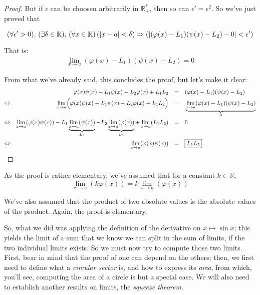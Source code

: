 \documentclass[solutions.tex]{subfiles}
\begin{document}
\begin{proof}
But if $\epsilon$ can be choosen arbitrarily in $\mathbb{R}^*_+$, then
so can $\epsilon'=\epsilon^2$. So we've just proved that

\[ \epsdelta{\epsilon'}{\delta}{a}{x}{(\varphi(x)-L_1)(\psi(x)-L_2)}{0}  \]

That is:
\begin{equation*} \begin{aligned}
	\lim_{x\rightarrow a}(\varphi(x)-L_1)(\psi(x)-L_2) = 0
\end{aligned} \end{equation*}

From what we've already said, this concludes the proof, but let's
make it clear:
\begin{equation*} \begin{aligned}
	~ && \varphi(x)\psi(x)-L_1\psi(x)-L_2\varphi(x)+L_1L_2 &&=\quad&
		(\varphi(x)-L_1)(\psi(x)-L_2) \\
	\Leftrightarrow &&
		\lim_{x\rightarrow a}\Bigl(\varphi(x)\psi(x)-L_1\psi(x)-L_2\varphi(x)+L_1L_2\Bigr) &&=\quad&
		\underbrace{\lim_{x\rightarrow a}(\varphi(x)-L_1)(\psi(x)-L_2)}_0 \\
	\Leftrightarrow &&
		\lim_{x\rightarrow a}(\varphi(x)\psi(x))
		-L_1\underbrace{\lim_{x\rightarrow a}(\psi(x))}_{L_2}
		-L_2\underbrace{\lim_{x\rightarrow a}(\varphi(x))}_{L_1}
		+\lim_{x\rightarrow a}(L_1L_2) &&=\quad& 0 \\
	\Leftrightarrow &&
		\lim_{x\rightarrow a}(\varphi(x)\psi(x)) &&=\quad& \boxed{L_1L_2}
\end{aligned} \end{equation*}
\end{proof}
\begin{remark} As the proof is rather elementary, we've assumed that for a
constant $k\in\mathbb{R}$,
\[
	\lim_{x\rightarrow a}(k\varphi(x))=k\lim_{x\rightarrow a}(\varphi(x))
\]

We've also assumed that the product of two absolute values is the
absolute values of the product. Again, the proof is elementary.
\end{remark}
\hrr

So, what we did was applying the definition of the derivative
on $x\mapsto\sin x$; this yields the limit of a sum that we know we can
split in the sum of limits, if the two individual limits exists. So we
must now try to compute those two limits. \\

First, bear in mind that the proof of one can depend on the others; then,
we first need to define what a \textit{circular sector} is,
and how to express its \textit{area}, from which, you'll see, computing
the area of a circle is but a special case. We will also need to establish
another results on limits, the \textit{squeeze theorem}.
\end{document}
